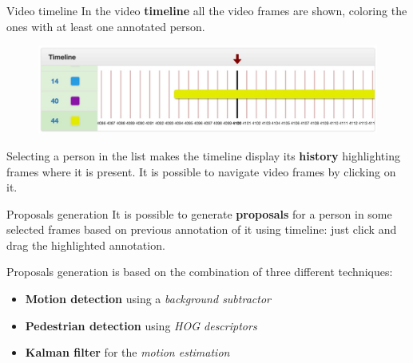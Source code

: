 \documentclass{beamer}
\begin{document}
\begin{tframe}{Video timeline}
In the video \textbf{timeline} all the video frames are shown, coloring the ones with at least one annotated person. 
\vspace{0.2cm}
\begin{figure}[h]
\centering
\includegraphics[scale=0.22]{images/timeline.jpg}
\end{figure}
\vspace{0.2cm}
Selecting a person in the list makes the timeline display its \textbf{history} highlighting frames where it is present. It is possible to navigate video frames by clicking on it.
\end{tframe}

\begin{tframe}{Proposals generation}
It is possible to generate \textbf{proposals} for a person in some selected frames based on previous annotation of it using timeline: just click and drag the highlighted annotation.

\vspace{0.3cm}

Proposals generation is based on the combination of three different techniques:
\vspace{0.4cm}
\begin{itemize}
\item \textbf{Motion detection} using a \emph{background subtractor}
\vspace{0.2cm}
\item \textbf{Pedestrian detection} using \emph{HOG descriptors}
\vspace{0.2cm}
\item \textbf{Kalman filter} for the \emph{motion estimation}
\end{itemize}
\end{tframe}
\end{document}

